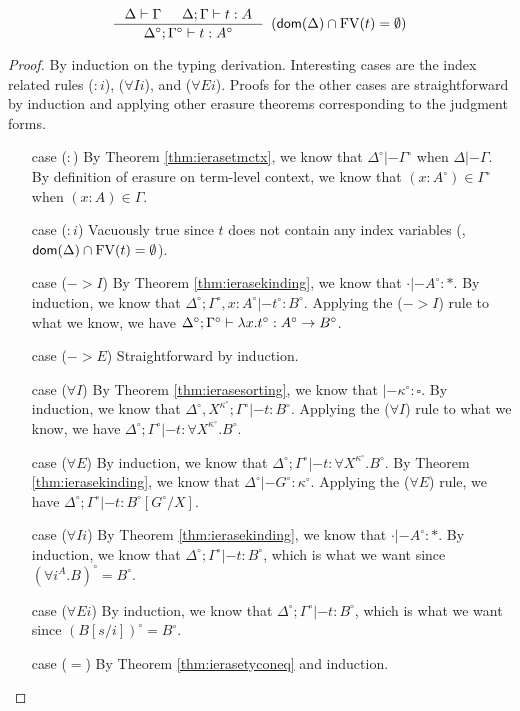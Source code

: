 \begin{theorem}
\label{thm:ierasetypingifree}
\[ \inference{ \Delta |- \Gamma & \Delta;\Gamma |- t : A}
		{\Delta^\circ;\Gamma^\circ |- t : A^\circ}
		{\enspace(\dom(\Delta)\cap\FV(t) = \emptyset)}
\]
\end{theorem}
\begin{proof} By induction on the typing derivation.
	Interesting cases are the index related rules ($:i$), ($\forall Ii$),
	and ($\forall Ei$). Proofs for the other cases are straightforward
	by induction and applying other erasure theorems corresponding to
	the judgment forms.
\begin{itemize}
\item[case] ($:$)
	By Theorem \ref{thm:ierasetmctx}, we know that
	$\Delta^\circ|- \Gamma^\circ$ when $\Delta|- \Gamma$.
	By definition of erasure on term-level context, we know that
	$(x:A^\circ) \in \Gamma^\circ$ when $(x:A) \in \Gamma$.
\item[case] ($:i$)
	Vacuously true since $t$ does not contain any index variables
        (\ie, $\mathop{\mathsf{dom}}(\Delta)\cap\mathop{\mathrm{FV}}(t) = \emptyset$).
\item[case] ($->$$I$)
	By Theorem \ref{thm:ierasekinding}, we know that $\cdot |- A^\circ:*$.
	By induction, we know that
	$\Delta^\circ;\Gamma^\circ,x:A^\circ |- t^\circ : B^\circ$.
	Applying the ($->$$I$) rule to what we know, we have
	$\Delta^\circ;\Gamma^\circ |- \lambda x.t^\circ : A^\circ -> B^\circ$.
\item[case] ($->$$E$)
	Straightforward by induction.
\item[case] ($\forall I$)
	By Theorem \ref{thm:ierasesorting}, we know that
	$|- \kappa^\circ:\square$.
	By induction, we know that
	$\Delta^\circ,X^{\kappa^\circ};\Gamma^\circ |- t : B^\circ$.
	Applying the ($\forall I$) rule to what we know, we have
	$\Delta^\circ;\Gamma^\circ |- t : \forall X^{\kappa^\circ}.B^\circ$.
\item[case] ($\forall E$)
	By induction, we know that
	$\Delta^\circ;\Gamma^\circ |- t : \forall X^{\kappa^\circ}.B^\circ$.
	By Theorem \ref{thm:ierasekinding}, we know that
	$\Delta^\circ |- G^\circ : \kappa^\circ$.
	Applying the ($\forall E$) rule, we have
	$\Delta^\circ;\Gamma^\circ |- t : B^\circ[G^\circ / X]$.
\item[case] ($\forall Ii$)
	By Theorem \ref{thm:ierasekinding}, we know that $\cdot |- A^\circ:*$.
	By induction, we know that $\Delta^\circ;\Gamma^\circ |- t : B^\circ$,
	which is what we want since $(\forall i^A.B)^\circ = B^\circ$.
\item[case] ($\forall Ei$)
	By induction, we know that $\Delta^\circ;\Gamma^\circ |- t : B^\circ$,
	which is what we want since $(B[s/i])^\circ = B^\circ$.
\item[case] ($=$)
	By Theorem \ref{thm:ierasetyconeq} and induction.\qedhere
\end{itemize}
\end{proof}

